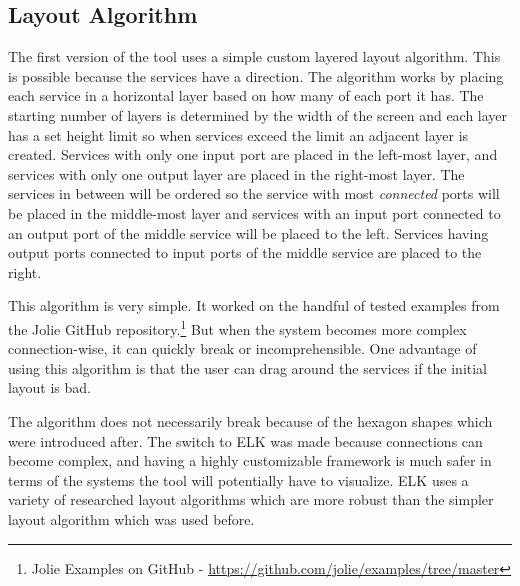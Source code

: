 \subsection{Layout Algorithm}
The first version of the tool uses a simple custom layered layout algorithm. This is possible because the services have a direction.
The algorithm works by placing each service in a horizontal layer based on how many of each port it has. The starting number of layers is determined by the width of the screen and each layer has a set height limit so when services exceed the limit an adjacent layer is created.
Services with only one input port are placed in the left-most layer, and services with only one output layer are placed in the right-most layer.
The services in between will be ordered so the service with most \textit{connected} ports will be placed in the middle-most layer and services with an input port connected to an output port of the middle service will be placed to the left. Services having output ports connected to input ports of the middle service are placed to the right.

This algorithm is very simple. It worked on the handful of tested examples from the Jolie GitHub repository.\footnote{Jolie Examples on GitHub - \url{https://github.com/jolie/examples/tree/master}}
But when the system becomes more complex connection-wise, it can quickly break or incomprehensible. One advantage of using this algorithm is that the user can drag around the services if the initial layout is bad.

The algorithm does not necessarily break because of the hexagon shapes which were introduced after. The switch to ELK was made because connections can become complex, and having a highly customizable framework is much safer in terms of the systems the tool will potentially have to visualize.
ELK uses a variety of researched layout algorithms which are more robust than the simpler layout algorithm which was used before.

